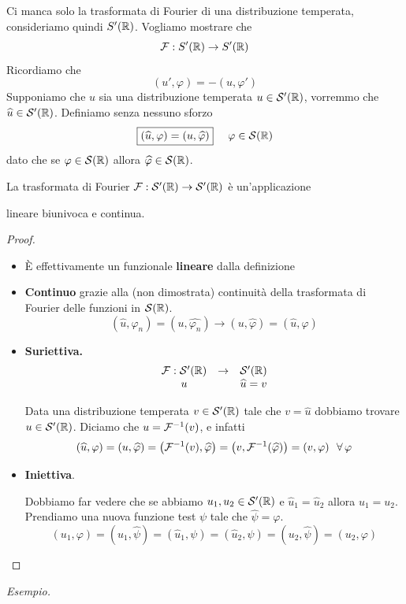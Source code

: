 Ci manca solo la trasformata di Fourier di una distribuzione temperata, consideriamo quindi $S'(\mathbb{R})$. Vogliamo mostrare che
\begin{equation*}
\mathcal{F} : S'(\mathbb{R})\rightarrow S'(\mathbb{R})
\end{equation*}
Ricordiamo che
\begin{equation*}
(u', \varphi) = - (u, \varphi')
\end{equation*}
Supponiamo che $u$ sia una distribuzione temperata $u\in \mathcal{S}'(\mathbb{R})$, vorremmo che $\widehat{u} \in \mathcal{S}'(\mathbb{R})$. Definiamo senza nessuno sforzo
\begin{equation*}
\boxed{(\hat{u}, \varphi) = (u, \hat{\varphi})} \ \ \ \ \varphi \in \Sc(\RR)
\end{equation*}
dato che se $\varphi \in \mathcal{S}(\mathbb{R})$ allora $\widehat{\varphi} \in \mathcal{S}(\mathbb{R})$.
\begin{thm}
La trasformata di Fourier $\mathcal{F} : \mathcal{S}'(\mathbb{R})\rightarrow \mathcal{S}'(\mathbb{R})$ è un'applicazione

lineare biunivoca e continua.
\end{thm}
\begin{proof}\leavevmode
\begin{itemize}
\item È effettivamente un funzionale \textbf{lineare} dalla definizione
\item \textbf{Continuo} grazie alla (non dimostrata) continuità della trasformata di Fourier delle funzioni in $\mathcal{S}(\mathbb{R})$.
\begin{equation*}
(\hat{u}, \varphi_{n}) = \left(u, \widehat{\varphi_{n}}\right)\rightarrow (u, \hat{\varphi}) = (\hat{u}, \varphi)
\end{equation*}
\item \textbf{Suriettiva.}
\begin{equation*}
\begin{array}{c c c}
\mathcal{F} : \mathcal{S}'(\mathbb{R}) & \rightarrow & \mathcal{S}'(\mathbb{R})\\
u & & \widehat{u} = v
\end{array}
\end{equation*}

Data una distribuzione temperata $v\in \mathcal{S}'(\mathbb{R})$ tale che $v = \hat{u}$ dobbiamo trovare $u\in \mathcal{S}'(\mathbb{R})$. Diciamo che $u = \mathcal{F}^{- 1}(v)$, e infatti
\begin{equation*}
(\hat{u}, \varphi) = (u, \hat{\varphi}) = \left(\Fc^{- 1}(v), \hat{\varphi}\right) = \left(v, \Fc^{- 1}(\hat{\varphi})\right) = (v, \varphi) \ \ \forall \varphi
\end{equation*}
\item \textbf{Iniettiva}.

Dobbiamo far vedere che se abbiamo $u_{1}, u_{2} \in \mathcal{S}'(\mathbb{R})$ e $\hat{u}_{1} = \hat{u}_{2}$ allora $u_{1} = u_{2}$. Prendiamo una nuova funzione test $\psi $ tale che $\hat{\psi} = \varphi $.
\begin{equation*}
(u_{1}, \varphi) = (u_{1}, \hat{\psi}) = (\hat{u}_{1}, \psi) = (\hat{u}_{2}, \psi) = (u_{2}, \hat{\psi}) = (u_{2}, \varphi)
\end{equation*}
\end{itemize}
\end{proof}
\textit{Esempio.}

